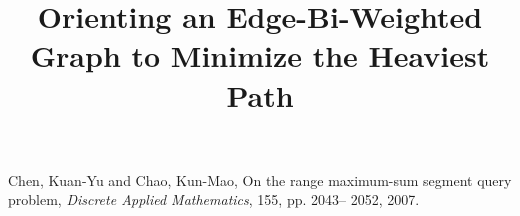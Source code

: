 \documentclass[a4paper,12pt]{article}
\begin{document}
\sloppy
	

\author{}
\title{Orienting an Edge-Bi-Weighted Graph to Minimize the Heaviest Path}
\date{}


\newcommand{\vecP}{\vec{P}}
\newcommand{\vecO}{\vec{O}}
\newcommand{\vecG}{\vec{G}}
\newcommand{\dir}[1]{\stackrel{\rightarrow}{#1}}
\newcommand{\dirO}[1][O]{\stackrel{\rightarrow}{#1}}

\maketitle







\begin{thebibliography}{99}
	 Chen, Kuan-Yu and Chao, Kun-Mao,
	On the range maximum-sum segment query problem,
	{\it Discrete Applied Mathematics}, 155, pp. 2043-- 2052, 2007.
\end{thebibliography}
\end{document}
